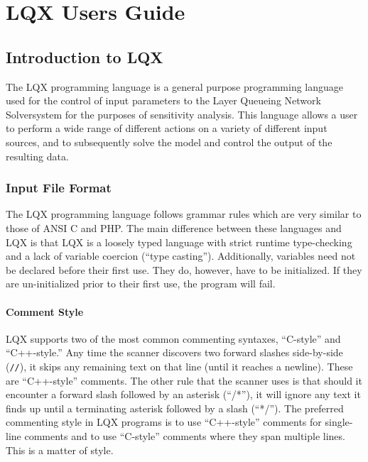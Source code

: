 \newcommand{\ModLang}{LQX }
\newcommand{\lqns}{Layer Queueing Network Solver}

\chapter{\ModLang Users Guide}
\section{Introduction to \ModLang}

The \ModLang programming language is a general purpose programming 
language used for the control of input parameters to the \lqns system
for the purposes of sensitivity analysis. This language allows a user to
perform a wide range of different actions on a variety of different input
sources, and to subsequently solve the model and control the output of
the resulting data.

\subsection{Input File Format}

The \ModLang programming language follows grammar rules which are very
similar to those of ANSI C and PHP. The main difference between these 
languages and \ModLang is that \ModLang is a loosely typed language with
strict runtime type-checking and a lack of variable coercion 
(``type casting''). Additionally, variables need not be declared before
their first use. They do, however, have to be initialized. If they
are un-initialized prior to their first use, the program will fail.

\subsubsection{Comment Style}

\ModLang supports two of the most common commenting syntaxes, ``C-style'' 
and ``C++-style.'' Any time the scanner discovers two forward slashes
side-by-side ({\tt //}), it skips any remaining text on that line 
(until it reaches a newline). These are ``C++-style'' comments. The other
rule that the scanner uses is that should it encounter a forward slash
followed by an asterisk (``/*''), it will ignore any text it finds up
until a terminating asterisk followed by a slash (``*/''). The preferred
commenting style in \ModLang programs is to use ``C++-style'' comments
for single-line comments and to use ``C-style'' comments where they
span multiple lines. This is a matter of style.

